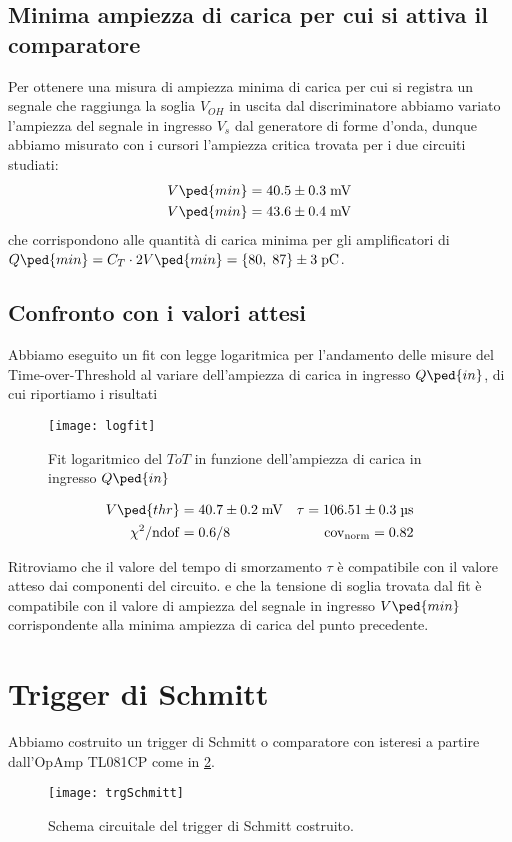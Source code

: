 \documentclass[10pt, a4paper, italian]{article}
\begin{document}
\subsection{Minima ampiezza di carica per cui si attiva il comparatore}
\label{sub: Qmin}
Per ottenere una misura di ampiezza minima di carica per cui si registra un
segnale che raggiunga la soglia $V_{OH}$ in uscita dal discriminatore abbiamo
variato l'ampiezza del segnale in ingresso $V_s$ dal generatore di forme
d'onda, dunque abbiamo misurato con i cursori l'ampiezza critica trovata per
i due circuiti studiati:
\begin{align*}
V\ped{min} &= 40.5 \pm 0.3 \; \si{m\V} \\ 
V\ped{min} &= 43.6 \pm 0.4 \; \si{m\V}
\end{align*}
che corrispondono alle quantità di carica minima per gli amplificatori di
$Q\ped{min} = C_T \cdot 2V\ped{min} =
\{80, \; 87\} \pm  3 \; \si{\pico\coulomb}$.

\subsection{Confronto con i valori attesi}
Abbiamo eseguito un fit con legge logaritmica per l'andamento delle misure
del Time-over-Threshold al variare dell'ampiezza di carica in ingresso
$Q\ped{in}$, di cui riportiamo i risultati
\begin{figure}[htbp]
    \centering
	\texttt{[image: logfit]}
    \caption{Fit logaritmico del $ToT$ in funzione dell'ampiezza di carica in
    ingresso $Q\ped{in}$ \label{fig: logfit}}
\end{figure}
\begin{align*}
V\ped{thr} &= 40.7 \pm 0.2 \; \si{m\V}
&\tau = 106.51 \pm 0.3 \; \si{\micro\s} \\
\chi^2/\mathrm{ndof} &= 0.6/8 &\mathrm{cov_{norm}} = 0.82
\end{align*}

Ritroviamo che il valore del tempo di smorzamento $\tau$ è compatibile con il
valore atteso dai componenti del circuito.
e che la tensione di soglia trovata dal fit è compatibile con il valore di
ampiezza del segnale in ingresso $V\ped{min}$ corrispondente alla minima
ampiezza di carica del punto precedente.

\section{Trigger di Schmitt}
Abbiamo costruito un trigger di Schmitt o comparatore con isteresi a partire
dall'OpAmp TL081CP come in \cref{fig: trgschmittschm}.
\begin{figure}[htbp]
    \centering
	\texttt{[image: trgSchmitt]}
    \caption{Schema circuitale del trigger di Schmitt costruito.
    \label{fig: trgschmittschm}}
\end{figure}
\end{document}
